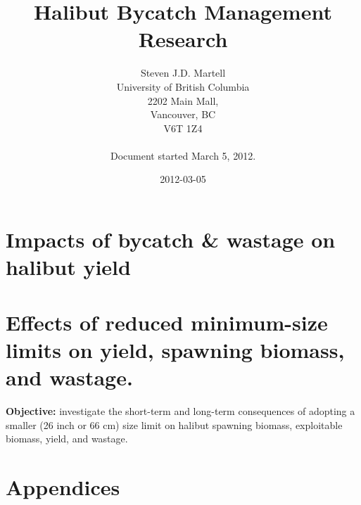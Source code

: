 \documentclass[]{report}
\title{Halibut Bycatch Management Research}
\author{ Steven J.D. Martell \\ University of British Columbia\\  2202 Main Mall, \\ Vancouver, BC\\ V6T 1Z4\\
%
\noindent\hrulefill\\
Document started March 5, 2012.
 }
\date{2012-03-05}
\begin{document}
\ifpdf
{}
\else
{}
\fi

	\maketitle \thispagestyle{empty}
\thispagestyle{empty}
\clearpage


\newpage





\newpage
\tableofcontents
{}
\newpage

\listoffigures
{}
\newpage

\listoftables
{}
\newpage



\part{Impacts of bycatch \& wastage on halibut yield}
\setcounter{chapter}{1}





\part{Effects of reduced minimum-size limits on yield, spawning biomass, and wastage.}
\setcounter{chapter}{2}

\textbf{Objective:} investigate the short-term and long-term consequences of adopting a smaller (26 inch or 66 cm) size limit on halibut spawning biomass, exploitable biomass, yield, and wastage.





\clearpage
%




\part{Appendices}
\appendix

\addtocounter{section}{0}
\renewcommand{\thetable}{A-\arabic{table}}
\setcounter{table}{0}
\setcounter{chapter}{1}

\setcounter{chapter}{2}

\end{document}
